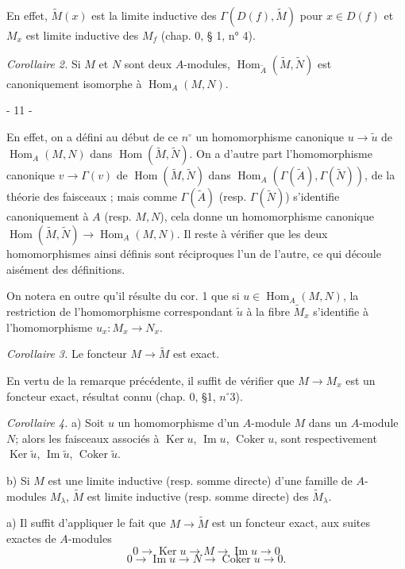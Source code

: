 En effet, $\tilde{M}(x)$ est la limite inductive des $\Gamma(D(f), \tilde{M})$ pour $x \in D(f)$ et $M_x$ est limite inductive des $M_f$ (chap. 0, § 1, n° 4).

\emph{Corollaire 2.} Si $M$ et $N$ sont deux $A$-modules, $\operatorname{Hom}_{\tilde{A}}(\tilde{M}, \tilde{N})$ est canoniquement isomorphe à $\operatorname{Hom}_A(M, N)$.

\newpage


- 11 -

En effet, on a défini au début de ce $n^{\circ}$ un homomorphisme canonique $u \to \tilde{u}$ de $\operatorname{Hom}_A(M, N)$ dans $\operatorname{Hom}(\tilde{M}, \tilde{N})$. On a d'autre part l'homomorphisme canonique $v \to \Gamma(v)$ de $\operatorname{Hom}(\tilde{M}, \tilde{N})$ dans $\operatorname{Hom}_A(\Gamma(\tilde{A}), \Gamma(\tilde{N}))$, de la théorie des faisceaux ; mais comme $\Gamma(\tilde{A})$ (resp. $\Gamma(\tilde{N})$) s'identifie canoniquement à $A$ (resp. $M, N$), cela donne un homomorphisme canonique $\operatorname{Hom}(\tilde{M}, \tilde{N}) \to \operatorname{Hom}_A(M, N)$. Il reste à vérifier que les deux homomorphismes ainsi définis sont réciproques l'un de l'autre, ce qui découle aisément des définitions.

On notera en outre qu'il résulte du cor. 1 que si $u \in \operatorname{Hom}_A(M, N)$, la restriction de l'homomorphisme correspondant $\tilde{u}$ à la fibre $\tilde{M}_x$ s'identifie à l'homomorphisme $u_x: M_x \to N_x$.

\emph{Corollaire 3.} Le foncteur $M \to \tilde{M}$ est exact.

En vertu de la remarque précédente, il suffit de vérifier que $M \to M_x$ est un foncteur exact, résultat connu (chap. 0, §1, $n^{\circ}3$).

\emph{Corollaire 4.} a) Soit $u$ un homomorphisme d'un $A$-module $M$ dans un $A$-module $N$; alors les faisceaux associés à $\operatorname{Ker} u$, $\operatorname{Im} u$, $\operatorname{Coker} u$, sont respectivement $\operatorname{Ker} \tilde{u}$, $\operatorname{Im} \tilde{u}$, $\operatorname{Coker} \tilde{u}$.

b) Si $M$ est une limite inductive (resp. somme directe) d'une famille de $A$-modules $M_{\lambda}$, $\tilde{M}$ est limite inductive (resp. somme directe) des $\tilde{M}_{\lambda}$.

a) Il suffit d'appliquer le fait que $M \to \tilde{M}$ est un foncteur exact, aux suites exactes de $A$-modules
$$0 \to \operatorname{Ker} u \to M \to \operatorname{Im} u \to 0$$
$$0 \to \operatorname{Im} u \to N \to \operatorname{Coker} u \to 0.$$

